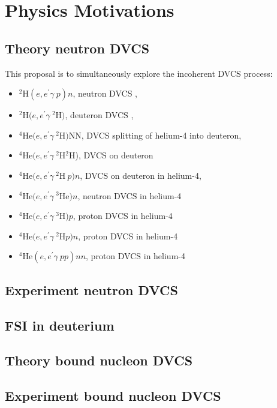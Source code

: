 
\chapter{Physics Motivations}
\label{chap:physics}


\section{Theory neutron DVCS}

This proposal is to simultaneously explore the incoherent DVCS process:
\begin{itemize}
   \item $^2$H$(e,e^{\prime}\gamma~p)n$,        neutron DVCS ,
   \item $^2$H$(e,e^{\prime}\gamma~^2$H$)$,     deuteron DVCS ,
   \item $^4$He$(e,e^{\prime}\gamma~^2$H$)$NN,  DVCS splitting of helium-4 into deuteron,
   \item $^4$He$(e,e^{\prime}\gamma~^2$H$^2$H), DVCS on deuteron
   \item $^4$He$(e,e^{\prime}\gamma~^2$H$~p)n$, DVCS on deuteron in helium-4,
   \item $^4$He$(e,e^{\prime}\gamma~^3$He$)n$,  neutron DVCS in  helium-4
   \item $^4$He$(e,e^{\prime}\gamma~^3$H$)p$,   proton DVCS in  helium-4
   \item $^4$He$(e,e^{\prime}\gamma~^2$H$p)n$,  proton DVCS in  helium-4
   \item $^4$He$(e,e^{\prime}\gamma~pp)nn$,     proton DVCS in  helium-4
\end{itemize}

\section{Experiment neutron DVCS}

\section{FSI in deuterium}

\section{Theory bound nucleon DVCS}

\section{Experiment bound nucleon DVCS}


